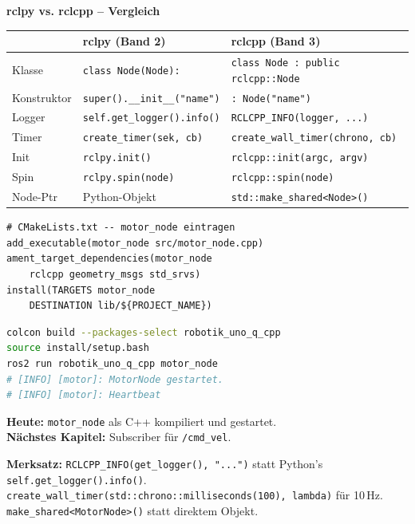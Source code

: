 \begin{wissenBox}
\textbf{rclpy vs. rclcpp -- Vergleich}
\begin{center}
\begin{tabular}{lll}
\hline
\textbf{} & \textbf{rclpy (Band 2)} & \textbf{rclcpp (Band 3)} \\
\hline
Klasse & \texttt{class Node(Node):} & \texttt{class Node : public rclcpp::Node} \\
Konstruktor & \texttt{super().\_\_init\_\_("name")} & \texttt{: Node("name")} \\
Logger & \texttt{self.get\_logger().info()} & \texttt{RCLCPP\_INFO(logger, ...)} \\
Timer & \texttt{create\_timer(sek, cb)} & \texttt{create\_wall\_timer(chrono, cb)} \\
Init & \texttt{rclpy.init()} & \texttt{rclcpp::init(argc, argv)} \\
Spin & \texttt{rclpy.spin(node)} & \texttt{rclcpp::spin(node)} \\
Node-Ptr & Python-Objekt & \texttt{std::make\_shared<Node>()} \\
\hline
\end{tabular}
\end{center}
\end{wissenBox}

\begin{lstlisting}[style=cmake]
# CMakeLists.txt -- motor_node eintragen
add_executable(motor_node src/motor_node.cpp)
ament_target_dependencies(motor_node
    rclcpp geometry_msgs std_srvs)
install(TARGETS motor_node
    DESTINATION lib/${PROJECT_NAME})
\end{lstlisting}

\begin{lstlisting}[language=bash]
colcon build --packages-select robotik_uno_q_cpp
source install/setup.bash
ros2 run robotik_uno_q_cpp motor_node
# [INFO] [motor]: MotorNode gestartet.
# [INFO] [motor]: Heartbeat
\end{lstlisting}

\begin{projektBox}
\textbf{Heute:} \texttt{motor\_node} als C++ kompiliert und gestartet.\\
\textbf{Nächstes Kapitel:} Subscriber für \texttt{/cmd\_vel}.
\end{projektBox}

\begin{merksatzBox}
\textbf{Merksatz:}
\texttt{RCLCPP\_INFO(get\_logger(), "...")} statt Python's \texttt{self.get\_logger().info()}.
\texttt{create\_wall\_timer(std::chrono::milliseconds(100), lambda)} für 10\,Hz.
\texttt{make\_shared<MotorNode>()} statt direktem Objekt.
\end{merksatzBox}

